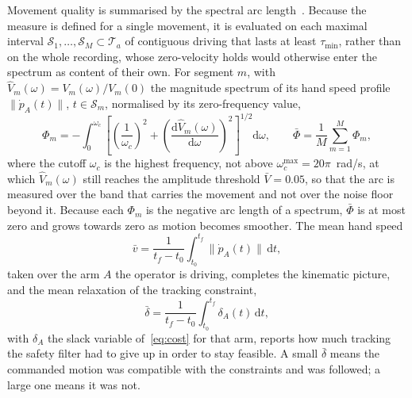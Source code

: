 \documentclass[12pt,a4paper,twoside,openright]{report}
\begin{document}
Movement quality is summarised by the spectral arc length~\cite{balasubramanian2015sparc}. Because the measure is defined for a single movement, it is evaluated on each maximal interval $\mathcal{S}_1, \dots, \mathcal{S}_M \subset \mathcal{T}_a$ of contiguous driving that lasts at least $\tau_{\min}$, rather than on the whole recording, whose zero-velocity holds would otherwise enter the spectrum as content of their own. For segment $m$, with $\hat{V}_m(\omega) = V_m(\omega)/V_m(0)$ the magnitude spectrum of its hand speed profile $\lVert \dot{p}_A(t) \rVert$, $t \in \mathcal{S}_m$, normalised by its zero-frequency value,
\begin{equation}
\Phi_m = -\int_{0}^{\omega_c} \left[ \left(\frac{1}{\omega_c}\right)^{2} + \left(\frac{\mathrm{d}\hat{V}_m(\omega)}{\mathrm{d}\omega}\right)^{2} \right]^{1/2} \mathrm{d}\omega,
\qquad
\bar{\Phi} = \frac{1}{M} \sum_{m=1}^{M} \Phi_m,
\label{eq:mPhi}
\end{equation}
where the cutoff $\omega_c$ is the highest frequency, not above $\omega_c^{\max} = 20\pi$~rad/s, at which $\hat{V}_m(\omega)$ still reaches the amplitude threshold $\bar{V} = 0.05$, so that the arc is measured over the band that carries the movement and not over the noise floor beyond it. Because each $\Phi_m$ is the negative arc length of a spectrum, $\bar{\Phi}$ is at most zero and grows towards zero as motion becomes smoother. The mean hand speed
\begin{equation}
\bar{v} = \frac{1}{t_f-t_0} \int_{t_0}^{t_f} \lVert \dot{p}_A(t) \rVert \, \mathrm{d}t,
\label{eq:mv}
\end{equation}
taken over the arm $A$ the operator is driving, completes the kinematic picture, and the mean relaxation of the tracking constraint,
\begin{equation}
\bar{\delta} = \frac{1}{t_f-t_0} \int_{t_0}^{t_f} \delta_A(t) \, \mathrm{d}t,
\label{eq:mdelta}
\end{equation}
with $\delta_A$ the slack variable of~\eqref{eq:cost} for that arm, reports how much tracking the safety filter had to give up in order to stay feasible. A small $\bar{\delta}$ means the commanded motion was compatible with the constraints and was followed; a large one means it was not.
\end{document}
